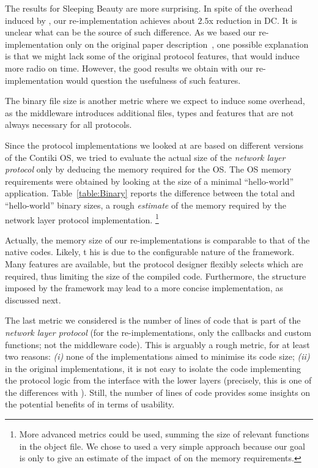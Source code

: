 The results for Sleeping Beauty are more surprising. In spite of the overhead induced by \baloo, our re-implementation achieves about $2.5$x reduction in DC. It is unclear what can be the source of such difference.
As we based our re-implementation only on the original paper description~\cite{sarkar2016Sleeping}, one possible explanation is that we might lack some of the original protocol features, that would induce more radio on time.
However, the good results we obtain with our re-implementation would question the usefulness of such features.

The binary file size is another metric where we expect \baloo to induce some overhead, as the middleware introduces additional files, types and features that are not always necessary for all protocols.

Since the protocol implementations we looked at are based on different versions of the Contiki OS, we tried to evaluate the actual size of the \textsl{network layer protocol} only by deducing the memory required for the OS. The OS memory requirements were obtained by looking at the size of a minimal ``hello-world'' application. Table~\ref{table:Binary} reports the difference between the total and ``hello-world'' binary sizes, a rough \textsl{estimate} of the memory required by the network layer protocol implementation.%
\footnote{%
More advanced metrics could be used, \eg summing the size of relevant functions in the object file. We chose to used a very simple approach because our goal is only to give an estimate of the impact of \baloo on the memory requirements.}

Actually, the memory size of our re-implementations is comparable to that of the native codes. Likely, t	his is due to the configurable nature of the framework. Many features are available, but the protocol designer flexibly selects which are required, thus limiting the size of the compiled code.
Furthermore, the structure imposed by the framework may lead to a more concise implementation, as discussed next.

The last metric we considered is the number of lines of code that is part of the \emph{network layer protocol} (\ie for the \baloo re-implementations, only the callbacks and custom functions; not the middleware code).
This is arguably a rough metric, for at least two reasons: \emph{(i)} none of the implementations aimed to minimise its code size; \emph{(ii)} in the original implementations, it is not easy to isolate the code implementing the protocol logic from the interface with the lower layers (precisely, this is one of the differences with \baloo).
Still, the number of lines of code provides some insights on the potential benefits of \baloo in terms of usability.

